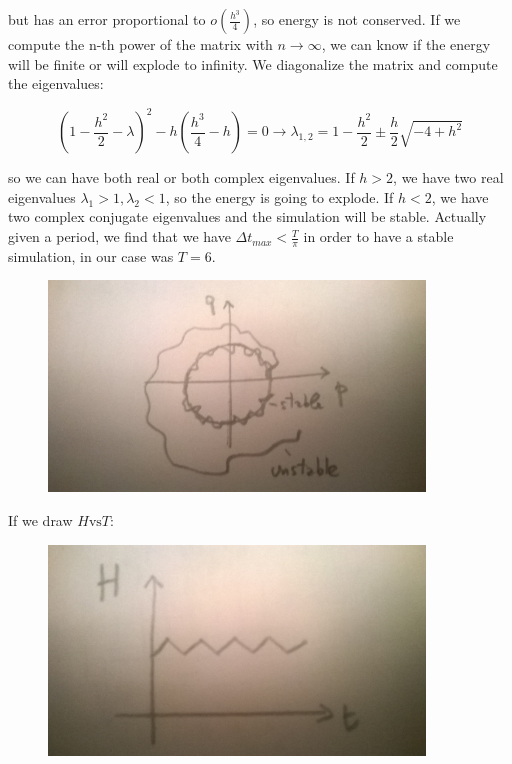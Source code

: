 \documentclass[a4paper, italian, openany]{book}
\begin{document}
but has an error proportional to $o(\frac{h^3}{4})$, so energy is not conserved. If we compute the n-th power of the matrix with $n \to \infty$, we can know if the energy will be finite or will explode to infinity.\newline
We diagonalize the matrix and compute the eigenvalues:

$$(1-\frac{h^2}{2} -\lambda)^2 - h(\frac{h^3}{4} -h) = 0 \rightarrow  \lambda_{1, 2} = 1-\frac{h^2}{2} \pm \frac{h}{2} \sqrt{-4 + h^2}$$

so we can have both real or both complex eigenvalues.\newline
If $h > 2$, we have two real eigenvalues $\lambda_1 >1, \lambda_2 <1$, so the energy is going to explode.\newline
If $h < 2$, we have two complex conjugate eigenvalues and the simulation will be stable.\newline
Actually given a period, we find that we have $\Delta t_{max} < \frac{T}{\pi}$ in order to have a stable simulation, in our case was $T = 6$.

\begin{figure}[H]
\centering
\includegraphics[width=100mm]{img/pic4.jpg}
\end{figure}

If we draw $H \mbox{vs} T$:

\begin{figure}[H]
\centering
\includegraphics[width=100mm]{img/pic5.jpg}
\end{figure}
\end{document}
